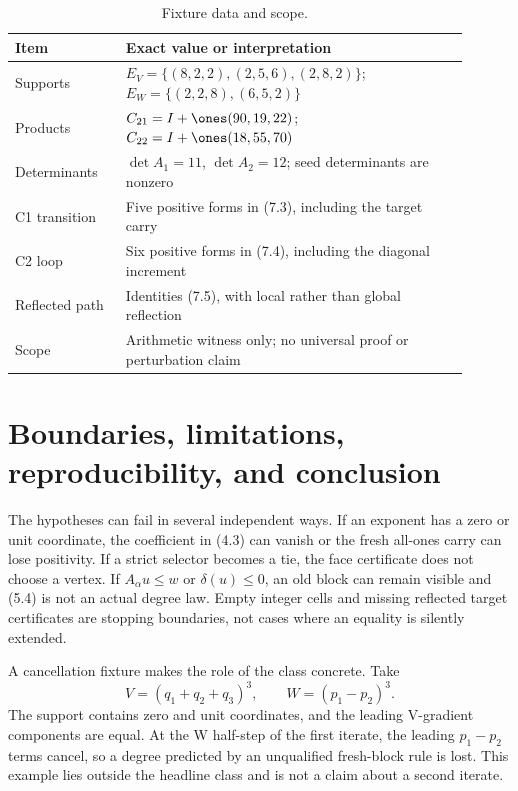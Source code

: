 \documentclass[11pt]{article}
\theoremstyle{definition}
\theoremstyle{remark}
\begin{document}
\begin{table}[t]
\centering
\small
\caption{Fixture data and scope.}
\label{tab:fixture}
\begin{tabular}{p{0.22\linewidth}p{0.68\linewidth}}
\toprule
Item & Exact value or interpretation\\
\midrule
Supports & $E_V=\{(8,2,2),(2,5,6),(2,8,2)\}$;
$E_W=\{(2,2,8),(6,5,2)\}$\\
Products & $C_{21}=I+\ones(90,19,22)$;
$C_{22}=I+\ones(18,55,70)$\\
Determinants & $\det A_1=11$, $\det A_2=12$; seed determinants are nonzero\\
C1 transition & Five positive forms in (7.3), including the target carry\\
C2 loop & Six positive forms in (7.4), including the diagonal increment\\
Reflected path & Identities (7.5), with local rather than global reflection\\
Scope & Arithmetic witness only; no universal proof or perturbation claim\\
\bottomrule
\end{tabular}
\end{table}

\section{Boundaries, limitations, reproducibility, and conclusion}

The hypotheses can fail in several independent ways.  If an exponent has a
zero or unit coordinate, the coefficient in (4.3) can vanish or the fresh
all-ones carry can lose positivity.  If a strict selector becomes a tie, the
face certificate does not choose a vertex.  If $A_\alpha u\leq w$ or
$\delta(u)\leq0$, an old block can remain visible and (5.4) is not an actual
degree law.  Empty integer cells and missing reflected target certificates
are stopping boundaries, not cases where an equality is silently extended.

A cancellation fixture makes the role of the class concrete.  Take
\[
 V=(q_1+q_2+q_3)^3,\qquad W=(p_1-p_2)^3.
\tag{8.1}
\]
The support contains zero and unit coordinates, and the leading V-gradient
components are equal.  At the W half-step of the first iterate, the leading
$p_1-p_2$ terms cancel, so a degree predicted by an unqualified fresh-block
rule is lost.  This example lies outside the headline class and is not a
claim about a second iterate.
\end{document}
